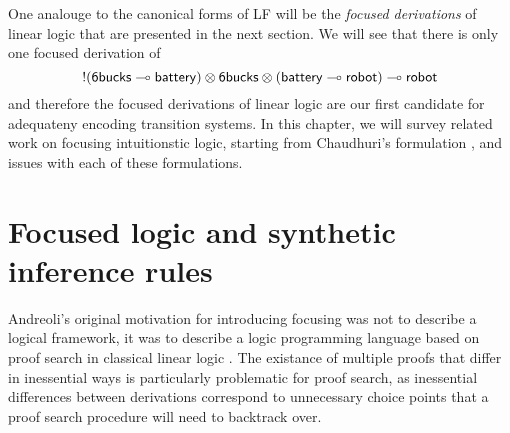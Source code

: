 One analouge to the canonical forms of LF will be the {\it focused
  derivations} of linear logic that are presented in the next
section. We will see that there is only
one focused derivation of 
\[{!}({\sf 6bucks} \multimap {\sf battery}) \otimes {\sf 6bucks} \otimes
({\sf battery} \multimap {\sf robot}) \multimap {\sf robot}\] and therefore
the focused derivations of linear logic are our first candidate for
adequateny encoding transition systems. In this chapter, we will
survey related work on focusing intuitionstic logic, starting from
Chaudhuri's formulation \cite{chaudhuri06focused}, and issues with
each of these formulations.

\section{Focused logic and synthetic inference rules}

Andreoli's original motivation for introducing focusing was not to
describe a logical framework, it was to describe a logic programming
language based on proof search in classical linear logic
\cite{andreoli92logic}. The existance of multiple proofs that differ
in inessential ways is particularly problematic for proof search, as
inessential differences between derivations correspond to unnecessary
choice points that a proof search procedure will need to backtrack
over. 

